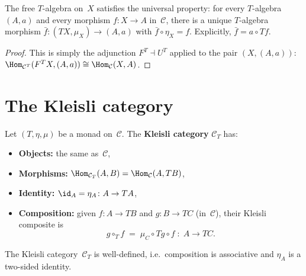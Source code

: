 \begin{proposition}\label{prop:free-algebra-universal}
The free $T$-algebra on~$X$ satisfies the universal property:
for every $T$-algebra $(A,a)$ and every morphism $f\colon X\to A$
in~$\mathcal{C}$, there is a unique $T$-algebra morphism
$\bar{f}\colon(TX,\mu_X)\to(A,a)$ with $\bar{f}\circ\eta_X = f$.
Explicitly, $\bar{f} = a\circ Tf$.
\end{proposition}

\begin{proof}
This is simply the adjunction $F^T\dashv U^T$ applied to the pair
$(X,(A,a))$: $\Hom_{\mathcal{C}^T}(F^TX,(A,a))\cong\Hom_{\mathcal{C}}(X,A)$.
\end{proof}


\section{The Kleisli category}\label{sec:kleisli}

\begin{definition}\label{def:kleisli}
Let $(T,\eta,\mu)$ be a monad on~$\mathcal{C}$.
The \textbf{Kleisli category} $\mathcal{C}_T$ has:
\begin{itemize}
\item \textbf{Objects:} the same as~$\mathcal{C}$,
\item \textbf{Morphisms:} $\Hom_{\mathcal{C}_T}(A,B) = \Hom_{\mathcal{C}}(A,TB)$,
\item \textbf{Identity:} $\id_A = \eta_A\colon A\to TA$,
\item \textbf{Composition:} given $f\colon A\to TB$ and $g\colon B\to TC$
    (in~$\mathcal{C}$), their Kleisli composite is
    \[
        g\circ_T f \;=\; \mu_C\circ Tg\circ f \;\colon\; A\to TC.
    \]
\end{itemize}
\end{definition}

\begin{proposition}\label{prop:kleisli-category}
The Kleisli category~$\mathcal{C}_T$ is well-defined, i.e.\
composition is associative and $\eta_A$ is a two-sided identity.
\end{proposition}

